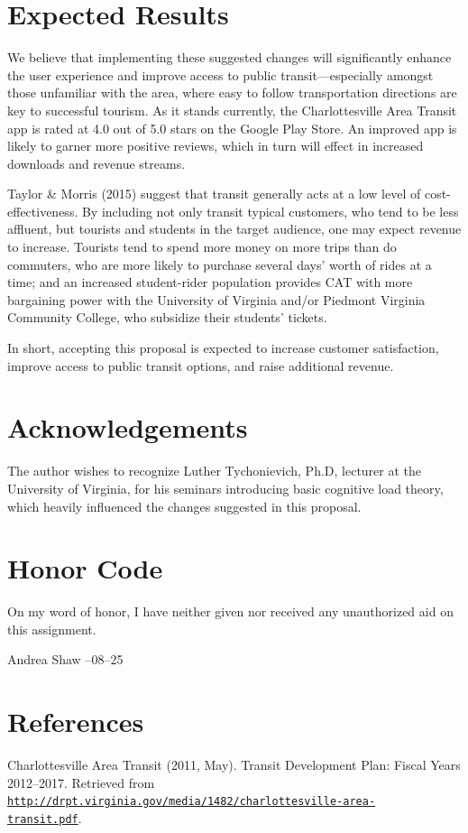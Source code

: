 \documentclass[12pt,letterpaper]{article}
\begin{document}
\section{Expected Results}
We believe that implementing these suggested changes will significantly enhance
the user experience and improve access to public transit---especially amongst
those unfamiliar with the area, where easy to follow transportation directions
are key to successful tourism. As it stands currently, the Charlottesville Area
Transit app is rated at 4.0 out of 5.0 stars on the Google Play Store. An improved
app is likely to garner more positive reviews, which in turn will effect in
increased downloads and revenue streams.

Taylor \& Morris (2015) suggest that transit generally acts at a low level of
cost-effectiveness. By including not only transit typical customers, who tend
to be less affluent, but tourists and students in the target audience, one may
expect revenue to increase. Tourists tend to spend more money on more trips
than do commuters, who are more likely to purchase several days' worth of rides
at a time; and an increased student-rider population provides CAT with more
bargaining power with the University of Virginia and/or Piedmont Virginia
Community College, who subsidize their students' tickets.

In short, accepting this proposal is expected to increase customer satisfaction,
improve access to public transit options, and raise additional revenue.

\section{Acknowledgements}
The author wishes to recognize Luther Tychonievich, Ph.D, lecturer at the
University of Virginia, for his seminars introducing basic
cognitive load theory, which heavily influenced the changes suggested in this
proposal.

\section{Honor Code}
On my word of honor, I have neither given nor received any unauthorized aid on this assignment.
\begin{center}
    Andrea Shaw\qquad {\hrulefill} --08--25
\end{center}

\section{References}
Charlottesville Area Transit (2011, May). Transit Development Plan: Fiscal Years 2012--2017. Retrieved from \href{http://drpt.virginia.gov/media/1482/charlottesville-area-transit.pdf}{\tt http://drpt.virginia.gov/media/1482/charlottesville-area- \\
transit.pdf}.
\end{document}
